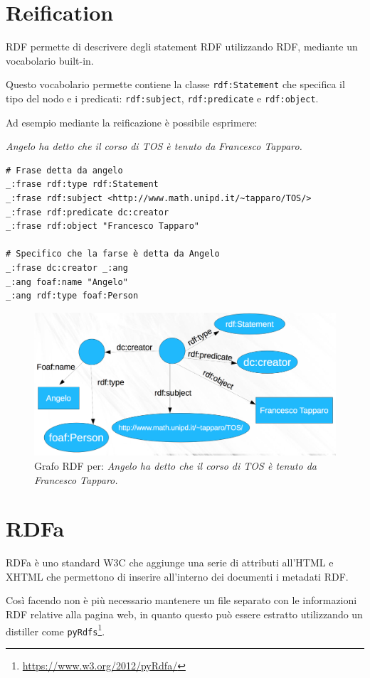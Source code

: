 \section{Reification}

RDF permette di descrivere degli statement RDF utilizzando RDF, mediante un vocabolario built-in.

Questo vocabolario permette contiene la classe \texttt{rdf:Statement} che specifica il tipo del nodo e i predicati: \texttt{rdf:subject}, \texttt{rdf:predicate} e \texttt{rdf:object}.

Ad esempio mediante la reificazione è possibile esprimere:

\begin{center}
	\textit{Angelo ha detto che il corso di TOS è tenuto da Francesco Tapparo.}
\end{center}

\begin{lstlisting}[caption=Reification con N-Triple, language=RDFA]
# Frase detta da angelo
_:frase rdf:type rdf:Statement
_:frase rdf:subject <http://www.math.unipd.it/~tapparo/TOS/>
_:frase rdf:predicate dc:creator
_:frase rdf:object "Francesco Tapparo"

# Specifico che la farse è detta da Angelo
_:frase dc:creator _:ang
_:ang foaf:name "Angelo"
_:ang rdf:type foaf:Person
\end{lstlisting}

\begin{figure}[htbp]
	\centering
	\includegraphics[width=.5\textwidth]{./images/reif_graph.png}
	\caption{Grafo RDF per: \textit{Angelo ha detto che il corso di TOS è tenuto da Francesco Tapparo.}}
\end{figure}

\section{RDFa}

RDFa è uno standard W3C che aggiunge una serie di attributi all'HTML e XHTML che permettono di inserire all'interno dei documenti i metadati RDF.

Così facendo non è più necessario mantenere un file separato con le informazioni RDF relative alla pagina web, in quanto questo può essere estratto utilizzando un distiller come \texttt{pyRdfs}\footnote{\url{https://www.w3.org/2012/pyRdfa/}}.

